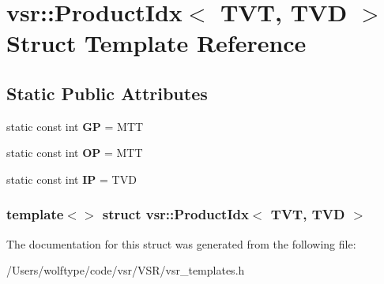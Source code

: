 \hypertarget{structvsr_1_1_product_idx_3_01_t_v_t_00_01_t_v_d_01_4}{\section{vsr\-:\-:Product\-Idx$<$ T\-V\-T, T\-V\-D $>$ Struct Template Reference}
\label{structvsr_1_1_product_idx_3_01_t_v_t_00_01_t_v_d_01_4}
}
\subsection*{Static Public Attributes}
\begin{DoxyCompactItemize}
\item 
\hypertarget{structvsr_1_1_product_idx_3_01_t_v_t_00_01_t_v_d_01_4_a5a6dd851febf29be0a203b3e849f0072}{static const int {\bfseries G\-P} = M\-T\-T}\label{structvsr_1_1_product_idx_3_01_t_v_t_00_01_t_v_d_01_4_a5a6dd851febf29be0a203b3e849f0072}

\item 
\hypertarget{structvsr_1_1_product_idx_3_01_t_v_t_00_01_t_v_d_01_4_af119e0333affaf57f58e38487990a693}{static const int {\bfseries O\-P} = M\-T\-T}\label{structvsr_1_1_product_idx_3_01_t_v_t_00_01_t_v_d_01_4_af119e0333affaf57f58e38487990a693}

\item 
\hypertarget{structvsr_1_1_product_idx_3_01_t_v_t_00_01_t_v_d_01_4_a70aeadc9ee4160e2e1a73a415c87cda7}{static const int {\bfseries I\-P} = T\-V\-D}\label{structvsr_1_1_product_idx_3_01_t_v_t_00_01_t_v_d_01_4_a70aeadc9ee4160e2e1a73a415c87cda7}

\end{DoxyCompactItemize}
\subsubsection*{template$<$$>$ struct vsr\-::\-Product\-Idx$<$ T\-V\-T, T\-V\-D $>$}



The documentation for this struct was generated from the following file\-:\begin{DoxyCompactItemize}
\item 
/\-Users/wolftype/code/vsr/\-V\-S\-R/vsr\-\_\-templates.\-h\end{DoxyCompactItemize}
